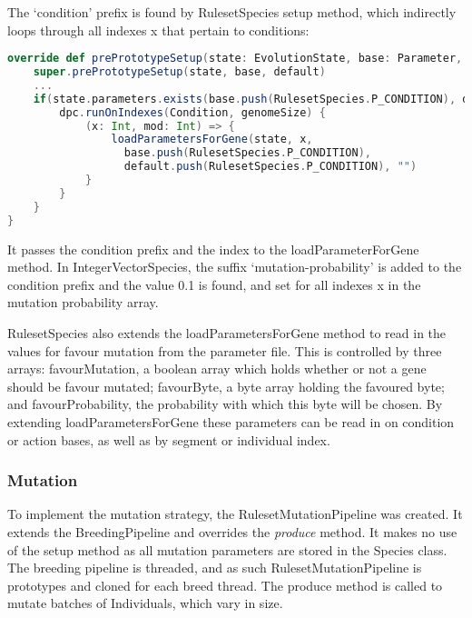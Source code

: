The `{\ttfamily condition}' prefix is found by RulesetSpecies setup method, which indirectly loops through all indexes {\ttfamily x} that pertain to conditions:

\begin{minipage}{0.9\linewidth}
\centering
\begin{lstlisting}[language=scala]
override def prePrototypeSetup(state: EvolutionState, base: Parameter, default: Parameter): Unit = {
    super.prePrototypeSetup(state, base, default)
    ...
    if(state.parameters.exists(base.push(RulesetSpecies.P_CONDITION), default.push(RulesetSpecies.P_CONDITION))) {
        dpc.runOnIndexes(Condition, genomeSize) {
            (x: Int, mod: Int) => {
                loadParametersForGene(state, x, 
                  base.push(RulesetSpecies.P_CONDITION), 
                  default.push(RulesetSpecies.P_CONDITION), "")
            }
        }
    }
}
\end{lstlisting}
\end{minipage}

It passes the condition prefix and the index to the loadParameterForGene method. In IntegerVectorSpecies, the suffix `{\ttfamily mutation-probability}' is added to the condition prefix and the value 0.1 is found, and set for all indexes {\ttfamily x} in the mutation probability array.

\vspace{\baselineskip}

RulesetSpecies also extends the loadParametersForGene method to read in the values for favour mutation from the parameter file. This is controlled by three arrays: favourMutation, a boolean array which holds whether or not a gene should be favour mutated; favourByte, a byte array holding the favoured byte; and favourProbability, the probability with which this byte will be chosen. By extending loadParametersForGene these parameters can be read in on condition or action bases, as well as by segment or individual index.


\subsubsection{Mutation}

To implement the mutation strategy, the RulesetMutationPipeline was created. It extends the BreedingPipeline and overrides the \emph{produce} method. It makes no use of the setup method as all mutation parameters are stored in the Species class. The breeding pipeline is threaded, and as such RulesetMutationPipeline is prototypes and cloned for each breed thread. The produce method is called to mutate batches of Individuals, which vary in size.


